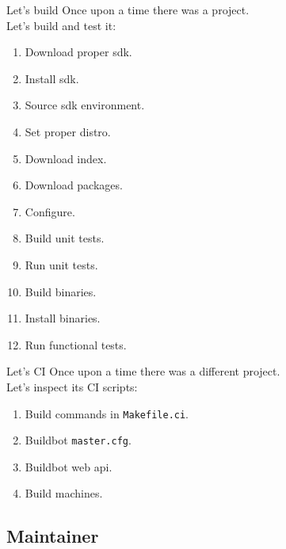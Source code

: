\documentclass{beamer}
\begin{document}
\begin{frame}{Let's build \color{blue}{(example)}}
    Once upon a time there was a project. \\
    Let's build and test it:
    \begin{multicols}{2}
        \begin{enumerate}
            \item Download proper sdk.
            \item Install sdk.
            \item Source sdk environment.
            \item Set proper distro.
            \item Download index.
            \item Download packages.
            \item Configure.
            \item Build unit tests.
            \item Run unit tests.
            \item Build binaries.
            \item Install binaries.
            \item Run functional tests.
        \end{enumerate}
    \end{multicols}
\end{frame}

\begin{frame}[fragile]{Let's CI \color{blue}{(example)}}
    Once upon a time there was a different project. \\
    Let's inspect its CI scripts:
    \vspace{\baselineskip}
    \begin{enumerate}
        \item Build commands in \verb|Makefile.ci|.
        \item Buildbot \verb|master.cfg|.
        \item Buildbot web api.
        \item Build machines.
    \end{enumerate}
\end{frame}

\subsection{Maintainer}
\end{document}
